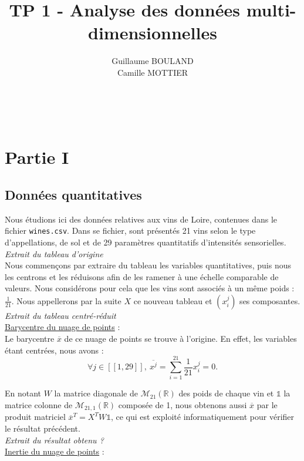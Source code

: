 \documentclass[a4paper,10pt]{article}
\title{TP 1 - Analyse des données multi-dimensionnelles}
\author{Guillaume BOULAND\\ Camille MOTTIER}
\date{}
\newcommand{\R}{\mathbb{R}}
\newcommand{\dsum}[2]{\displaystyle\sum_{#1}^{#2}}
\begin{document}
\maketitle

\

\section{Partie I}
\subsection{Données quantitatives}
Nous étudions ici des données relatives aux vins de Loire, contenues dans le fichier \texttt{wines.csv}. Dans se fichier, sont présentés 21 vins selon le type d'appellations, de sol et de 29 paramètres quantitatifs d'intensités sensorielles. \\

\textit{Extrait du tableau d'origine}\\

Nous commençons par extraire du tableau les variables quantitatives, puis nous les centrons et les réduisons afin de les ramener à une échelle comparable de valeurs. Nous considérons pour cela que les vins sont associés à un même poids : $\frac 1{21}$. 
Nous appellerons par la suite $X$ ce nouveau tableau et $(x_i^j)$ ses composantes.\\

\textit{Extrait du tableau centré-réduit}\\

\underline{Barycentre du nuage de points} :\\

Le barycentre $\overline{x}$ de ce nuage de points se trouve à l'origine. En effet, les variables étant centrées, nous avons : $$\forall j\in[\![1,29]\!],~\overline{x^j}=\dsum{i=1}{21}\frac 1{21}x_i^j=0.$$

En notant $W$ la matrice diagonale de $\mathcal M_{21}(\R)$ des poids de chaque vin et $\mathbb 1$ la matrice colonne de $\mathcal  M_{21,1}(\R)$ composée de 1, nous obtenons aussi $\overline x$ par le produit matriciel $\overline x^T=X^TW\mathbb 1$, ce qui est exploité informatiquement pour vérifier le résultat précédent.\\

\textit{Extrait du résultat obtenu ?} \\

\underline{Inertie du nuage de points} :\\
\end{document}
